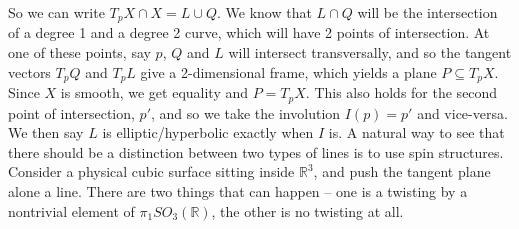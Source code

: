 So we can write \(T_pX \cap X = L \cup Q\). We know that \(L \cap Q\)
will be the intersection of a degree 1 and a degree 2 curve, which will
have 2 points of intersection. At one of these points, say \(p\), \(Q\)
and \(L\) will intersect transversally, and so the tangent vectors
\(T_pQ\) and \(T_pL\) give a 2-dimensional frame, which yields a plane
\(P \subseteq T_pX\). Since \(X\) is smooth, we get equality and
\(P = T_pX\). This also holds for the second point of intersection,
\(p'\), and so we take the involution \(I(p) = p'\) and vice-versa. We
then say \(L\) is elliptic/hyperbolic exactly when \(I\) is. A natural
way to see that there should be a distinction between two types of lines
is to use spin structures. Consider a physical cubic surface sitting
inside \({\mathbb{R}}^3\), and push the tangent plane alone a line.
There are two things that can happen -- one is a twisting by a
nontrivial element of \(\pi_1 SO_3({\mathbb{R}})\), the other is no
twisting at all.

